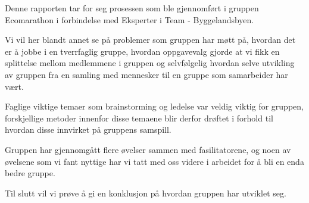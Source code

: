 Denne rapporten tar for seg prosessen som ble gjennomført i gruppen Ecomarathon i forbindelse med Eksperter i Team - Byggelandsbyen.

Vi vil her blandt annet se på problemer som gruppen har møtt på, hvordan det er å jobbe i en tverrfaglig gruppe, hvordan oppgavevalg gjorde at vi fikk en splittelse mellom medlemmene i gruppen og selvfølgelig hvordan selve utvikling av gruppen fra en samling med mennesker til en gruppe som samarbeider har vært.

Faglige viktige temaer som brainstorming og ledelse var veldig viktig for gruppen, forskjellige metoder innenfor disse temaene blir derfor drøftet i forhold til hvordan disse innvirket på gruppens samspill.

Gruppen har gjennomgått flere øvelser sammen med fasilitatorene, og noen av øvelsene som vi fant nyttige har vi tatt med oss videre i arbeidet for å bli en enda bedre gruppe.

Til slutt vil vi prøve å gi en konklusjon på hvordan gruppen har utviklet seg. 
